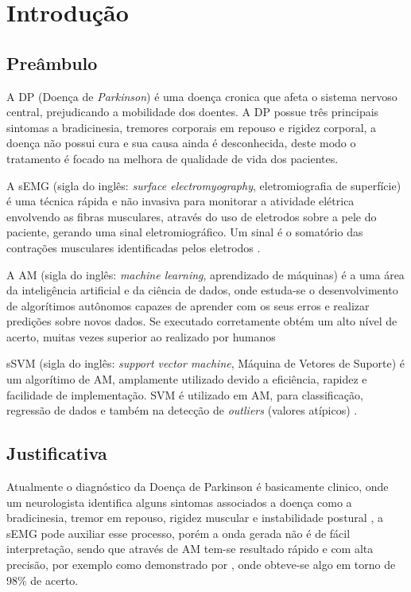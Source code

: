 \chapter[Introdução]{Introdução}
\section{Preâmbulo}
A DP (Doença de \textit{Parkinson}) é uma doença cronica que afeta o sistema nervoso central, prejudicando a mobilidade dos doentes. A DP possue três principais sintomas a bradicinesia, tremores corporais em repouso e rigidez corporal, a doença não possui cura e sua causa ainda é desconhecida, deste modo o tratamento é focado na melhora de qualidade de vida dos pacientes\cite{da2016aspectos}.

A sEMG (sigla do inglês: \textit{surface electromyography}, eletromiografia de superfície) é uma técnica rápida e não invasiva para monitorar a atividade elétrica envolvendo as fibras musculares, através do uso de eletrodos sobre a pele do paciente, gerando uma sinal eletromiográfico. Um sinal é o somatório das contrações musculares identificadas pelos eletrodos \cite{de2010eletromiografia}.

A AM (sigla do inglês: \textit{machine learning}, aprendizado de máquinas) é a uma área da inteligência artificial e da ciência de dados, onde estuda-se o desenvolvimento de algorítimos autônomos capazes de aprender com os seus erros e realizar predições sobre novos dados. Se executado corretamente obtém um alto nível de acerto, muitas vezes superior ao realizado por humanos \cite{Kohavi}

sSVM (sigla do inglês: \textit{support vector machine}, Máquina de Vetores de Suporte) é um algorítimo de AM, amplamente utilizado devido a eficiência, rapidez e facilidade de implementação. SVM é utilizado em AM, para classificação, regressão de dados e também na detecção de \textit{outliers} (valores atípicos) \cite{scikit-learn}.

\section{Justificativa}
Atualmente o diagnóstico da Doença de Parkinson é basicamente clinico, onde um neurologista identifica alguns sintomas associados a doença como a bradicinesia, tremor em repouso, rigidez muscular e instabilidade postural \cite{gago2014manual}, a sEMG pode auxiliar esse processo, porém a onda gerada não é de fácil interpretação, sendo que através de AM tem-se resultado rápido e com alta precisão, por exemplo como demonstrado por , onde obteve-se algo em torno de 98\% de acerto. 

